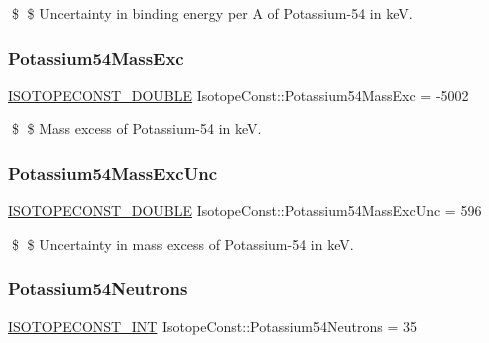 \$ \$ Uncertainty in binding energy per A of Potassium-\/54 in keV. \mbox{\label{group___isotope_const-_potassium-_k54_gad99aa094009ce2e40b25dd9f276e2726}} 
\subsubsection{\texorpdfstring{Potassium54\+Mass\+Exc}{Potassium54MassExc}}
{\footnotesize\ttfamily \mbox{\hyperlink{group___isotope_const-_macros_ga8f45a7272ce02c0b4c65c44636ed719a}{I\+S\+O\+T\+O\+P\+E\+C\+O\+N\+S\+T\+\_\+\+D\+O\+U\+B\+LE}} Isotope\+Const\+::\+Potassium54\+Mass\+Exc = -\/5002}

\$ \$ Mass excess of Potassium-\/54 in keV. \mbox{\label{group___isotope_const-_potassium-_k54_gaad7edb0ffb3c2cddc9e64f4e6cc30531}} 
\subsubsection{\texorpdfstring{Potassium54\+Mass\+Exc\+Unc}{Potassium54MassExcUnc}}
{\footnotesize\ttfamily \mbox{\hyperlink{group___isotope_const-_macros_ga8f45a7272ce02c0b4c65c44636ed719a}{I\+S\+O\+T\+O\+P\+E\+C\+O\+N\+S\+T\+\_\+\+D\+O\+U\+B\+LE}} Isotope\+Const\+::\+Potassium54\+Mass\+Exc\+Unc = 596}

\$ \$ Uncertainty in mass excess of Potassium-\/54 in keV. \mbox{\label{group___isotope_const-_potassium-_k54_ga024a73d24faa05c800a55745890954b1}} 
\subsubsection{\texorpdfstring{Potassium54\+Neutrons}{Potassium54Neutrons}}
{\footnotesize\ttfamily \mbox{\hyperlink{group___isotope_const-_macros_ga5f18360b3e99483a35c32d789e62621c}{I\+S\+O\+T\+O\+P\+E\+C\+O\+N\+S\+T\+\_\+\+I\+NT}} Isotope\+Const\+::\+Potassium54\+Neutrons = 35}

